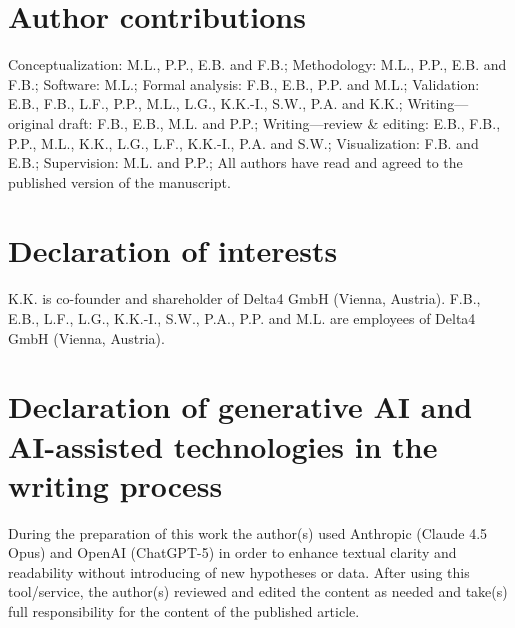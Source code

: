 \documentclass[12pt,letterpaper]{article}
\begin{document}
\section*{Author contributions}

Conceptualization: M.L., P.P., E.B. and F.B.; 
Methodology: M.L., P.P., E.B. and F.B.; 
Software: M.L.; 
Formal analysis: F.B., E.B., P.P. and M.L.; 
Validation: E.B., F.B., L.F., P.P., M.L., L.G., K.K.-I., S.W., P.A. and K.K.; 
Writing---original draft: F.B., E.B., M.L. and P.P.; 
Writing---review \& editing: E.B., F.B., P.P., M.L., K.K., L.G., L.F., K.K.-I., P.A. and S.W.; 
Visualization: F.B. and E.B.; 
Supervision: M.L. and P.P.;
All authors have read and agreed to the published version of the manuscript.

\section*{Declaration of interests}

K.K. is co-founder and shareholder of Delta4 GmbH (Vienna, Austria). 
F.B., E.B., L.F., L.G., K.K.-I., S.W., P.A., P.P. and M.L. are employees of Delta4 GmbH (Vienna, Austria).

\section*{Declaration of generative AI and AI-assisted technologies in the writing process}

During the preparation of this work the author(s) used Anthropic (Claude 4.5 Opus) and OpenAI (ChatGPT-5) in order to enhance textual clarity and readability without introducing of new hypotheses or data. After using this tool/service, the author(s) reviewed and edited the content as needed and take(s) full responsibility for the content of the published article.


\end{document}
